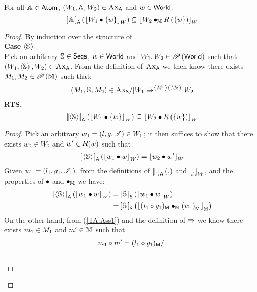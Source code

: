 \begin{theorem}\label{thrm:atomic-soundness}
For all $\atom{} \in \Atoms$, $\left(W_1, \atom{}, W_2\right) \in \AxiomsA$ and $w \in \Worlds$:
%
\[
	\opSemA{\atom{}}{\reifyW{W_1 \composeW \{w\}}} \subseteq \reifyW{W_2 \composeH \rely\left(\{w\}\right)}
\]
%
\begin{proof}
By induction over the structure of \atom{}.\\

\noindent\textbf{Case \hspace*{0.3cm}}$\atomic{\seq{}}$\\
Pick an arbitrary $\seq{} \in \Seqs$, $w \in \Worlds$ and $W_1, W_2 \in \pset{\Worlds}$ such that $\left(W_1, \atomic{\seq{}}, W_2\right) \in \AxiomsA$. From the definition of $\AxiomsA$ we then know there exists $\Hp{1}, \Hp{2} \in \pset{\Heaps}$ such that:
%
\begin{align}	
	(\Hp{1}, \seq{}, \Hp{2}) \in \AxiomsSeq /| \repartitions{W_1}{W_2}{\Hp{1}}{\Hp{2}} \label{TA:Ass1}
\end{align}
%
\textbf{RTS.}
%
\[
	\opSemA{\atomic{\seq{}}}{\reifyW{W_1 \composeW \{w\}}} \subseteq \reifyW{W_2 \composeW \rely\left(\{w\}\right)}
\]
%
\begin{proof}
Pick an arbitrary $w_1 = (l, g, \lmod) \in W_1$; it then suffices to show that there exists $w_2 \in W_2$ and $w' \in \rely(w)$ such that 
%
\begin{align}
	\opSemA{\atomic{\seq{}}}{\reifyW{w_1 \composeW w}} = \reifyW{w_2 \composeW w'}
	\label{TA:Goal1}
\end{align}
%
Given $w_1 = (l_1, g_1, \lmod_1)$, from the definitions of $\opSemA{.}{.}$ and $\reifyW{.}$, and the properties of $\composeW$ and $\composeH$ we have:
%
\begin{align}
	\opSemA{\atomic{\seq{}}}{\reifyW{w_1 \composeW w}} = & \opSemSeq{\seq{}}{\reifyW{w_1 \composeW w}} \nonumber\\
	 = & \opSemSeq{\seq{}}{\reifyH{\heapPart{(l_1  \composeL  g_1)} \composeH \heapPart{\left(\localPart{w}\right)}}}
	\label{TA:Ass2}
\end{align}
On the other hand, from (\ref{TA:Ass1}) and the definition of $\semimplies$ we know there exists $\h{1} \in \Hp{1}$ and $\h{}' \in \Heaps$ such that
%
\begin{align}
	& m_1 \composeL m' = \heapPart{(l_1  \composeL  g_1)} /| \label{TA:Ass3}\\
	& \begin{array}{@{} l @{} }

\end{array}
\end{align}
\end{proof}
\end{proof}
\end{theorem}

